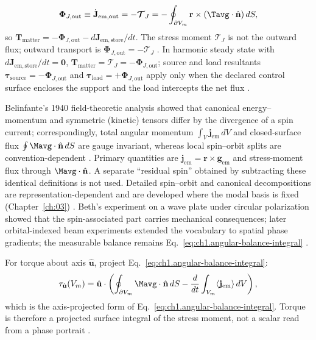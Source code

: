 \begin{equation}
\label{eq:ch1.outward-am-flux}
\boldsymbol{\Phi}_{J,\mathrm{out}}
\equiv
\dot{\mathbf{J}}_{\mathrm{em,out}}
=-\boldsymbol{\mathcal{T}}_J
=-\oint_{\partial V_m}\mathbf{r}\times(\Tavg\cdot\hat{\mathbf{n}})\,dS,
\end{equation}
so $\mathbf{T}_{\mathrm{matter}}=-\boldsymbol{\Phi}_{J,\mathrm{out}}-d\mathbf{J}_{\mathrm{em,store}}/dt$. The stress moment $\boldsymbol{\mathcal{T}}_J$ is not the outward flux; outward transport is $\boldsymbol{\Phi}_{J,\mathrm{out}}=-\boldsymbol{\mathcal{T}}_J$ \cite{stratton1941,beth1936}. In harmonic steady state with $d\mathbf{J}_{\mathrm{em,store}}/dt=\mathbf{0}$, $\mathbf{T}_{\mathrm{matter}}=\boldsymbol{\mathcal{T}}_J=-\boldsymbol{\Phi}_{J,\mathrm{out}}$; source and load resultants $\boldsymbol{\tau}_{\mathrm{source}}=-\boldsymbol{\Phi}_{J,\mathrm{out}}$ and $\boldsymbol{\tau}_{\mathrm{load}}=+\boldsymbol{\Phi}_{J,\mathrm{out}}$ apply only when the declared control surface encloses the support and the load intercepts the net flux \cite{beth1936}.

Belinfante's 1940 field-theoretic analysis \cite{belinfante1940} showed that canonical
energy--momentum and symmetric (kinetic) tensors differ by the divergence of a spin
current; correspondingly, total angular momentum
$\int_V \mathbf{j}_{\mathrm{em}}\,dV$ and closed-surface flux
$\oint \Mavg\cdot\hat{\mathbf{n}}\,dS$ are gauge invariant, whereas local spin--orbit splits are convention-dependent \cite{belinfante1940}. Primary quantities are $\mathbf{j}_{\mathrm{em}}=\mathbf{r}\times\mathbf{g}_{\mathrm{em}}$ and stress-moment flux through $\Mavg\cdot\hat{\mathbf{n}}$. A separate
``residual spin'' obtained by subtracting these identical definitions is not used.
Detailed spin--orbit and canonical decompositions are representation-dependent and are
developed where the modal basis is fixed (Chapter~\ref{ch:03}) \cite{belinfante1940,tai1994}.
Beth's experiment on a wave plate under circular polarization
\cite{beth1936} showed that the spin-associated part carries mechanical consequences; later orbital-indexed beam experiments
\cite{allen1992} extended the vocabulary to spatial phase gradients; the measurable
balance remains Eq.~\eqref{eq:ch1.angular-balance-integral} \cite{belinfante1940}.

For torque about axis $\hat{\mathbf{u}}$, project Eq.~\eqref{eq:ch1.angular-balance-integral}:
\begin{equation}
\label{eq:ch1.torque-observable}
\tau_{\hat{\mathbf{u}}}(V_m)
=\hat{\mathbf{u}}\cdot
\left(
\oint_{\partial V_m}\Mavg\cdot\hat{\mathbf{n}}\,dS
-\frac{d}{dt}\int_{V_m} \langle\mathbf{j}_{\mathrm{em}}\rangle\,dV
\right),
\end{equation}
which is the axis-projected form of Eq.~\eqref{eq:ch1.angular-balance-integral}.
Torque is therefore a projected surface integral of the stress moment, not a scalar read from a phase portrait \cite{beth1936,stratton1941}.

